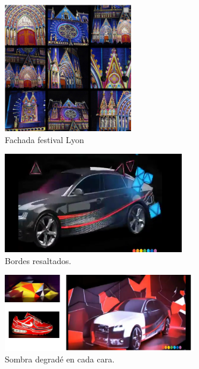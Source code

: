 \begin{figure}[H]
  \centering
    \includegraphics[width=0.5\textwidth]{./Cap1_intro/Fachada1.png}
  \caption[http://www.weltlighting.com/]{Fachada festival Lyon}
  \label{fig:Fachada1}
\end{figure}

\begin{minipage}{0.50\textwidth}
\begin{flushleft} \large
\begin{figure}[H]
  \centering
    \includegraphics[width=0.7\textwidth]{./Cap1_intro/Instalacion5.png}
  \caption[http://www.weltlighting.com/fragment/]{Bordes resaltados.}
  \label{fig:Instalacion1}
\end{figure}
\end{flushleft}
\end{minipage}
\begin{minipage}{0.50\textwidth}
\begin{flushright} \large
\begin{figure}[H]
  \centering
    \includegraphics[width=0.75\textwidth]{./Cap1_intro/Instalacion3.png}
  \caption[http://www.weltlighting.com/fragment/]{Sombra degradé en cada cara.}
  \label{fig:Instalacion2}
\end{figure}
\end{flushright}
\end{minipage}

